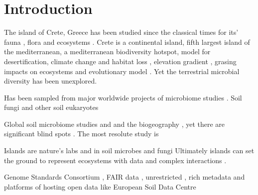 \documentclass[unnumsec,webpdf,contemporary,large]{oup-authoring-template}%
\theoremstyle{thmstyleone}%
\theoremstyle{thmstyletwo}%
\theoremstyle{thmstylethree}%
\begin{document}


\maketitle


\section{Introduction}\label{intro}

The island of Crete, Greece has been studied since the classical times for its' fauna \citep{Sidiropoulos_Polymeni_Legakis_2017,Anastasiou2018Tenebrionid}, flora \citep{Krimbas_2005} and ecosystems \citep{Grove1993}.
Crete is a continental island, fifth largest island of the mediterranean, a mediterranean biodiversity hotspot, model for desertification, climate change \citep{Kougioumoutzis2020} and habitat loss \citep{ISPIKOUDIS1993259},
elevation gradient \citep{trigas2013, FAZAN2017}, grasing impacts on ecosystems \citep{JouffroyBapicot2016} and evolutionary model \citep{POULAKAKIS2002}.
Yet the terrestrial microbial diversity has been unexplored.

Has been sampled from major worldwide projects of microbiome studies \citep{Vasar2022, Labouyrie2023, Bahram2018, Orgiazzi2018}. Soil fungi \citep{Mikryukov2023, Davison2021, Tedersoo2021} and other soil eukaryotes \citep{Aslani2022}

Global soil microbiome studies \citep{Delgado-Baquerizo2018} and \citep{Bahram2018} and the biogeography \citep{Martiny2006} \citep{Guerra2020}, \citep{Labouyrie2023} yet there are significant blind spots \citep{Guerra2020}. The most resolute study is \citep{Karimi2020}

Islands are nature's labs \citep{Whittaker2017} and in soil microbes \citep{Li2020} and fungi \citep{Delavaux2021}
Ultimately islands can set the ground to represent ecosystems with data and complex interactions \citep{Davies2016}.
\citep{Vogiatzakis2008_crete}
\citep{Vogiatzakis2016}

\citep{Sfenthourakis2017}
\citep{Vogiatzakis2008_med}
Genome Standards Consortium \citep{Field2011}, FAIR data \citep{Wilkinson2016}, unrestricted \citep{Amann2019},
rich metadata and platforms of hosting open data like European Soil Data Centre \citep{Panagos2022}
\end{document}
